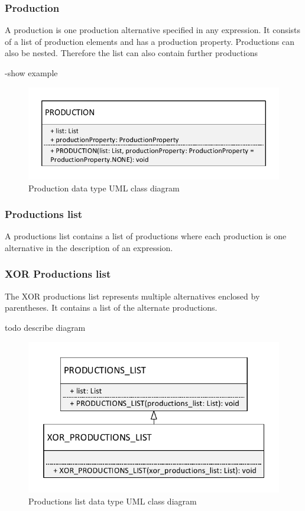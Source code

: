 \subsubsection{Production}
A production is one production alternative specified in any expression.
It consists of a list of production elements and has a production property. Productions can also be nested.
Therefore the list can also contain further productions

-show example
\begin{figure}[H]
\centering
\includegraphics[width=.5\textwidth]{images/Concept_uml_data_types_production.pdf}
\caption{Production data type UML class diagram}
\label{fig:ConceptSymbolsClassDiagram}
\end{figure}

\subsubsection{Productions list}
A productions list contains a list of productions where each production is one alternative in the description of an expression.


\subsubsection{XOR Productions list}
The XOR productions list represents multiple alternatives enclosed by parentheses. It contains a list of the alternate productions.
 
 todo describe diagram
\begin{figure}[H]
\centering
\includegraphics[width=.6\textwidth]{images/Concept_uml_data_types_productions_list.pdf}
\caption{Productions list data type UML class diagram}
\label{fig:ConceptProductionsListClassDiagram}
\end{figure}

